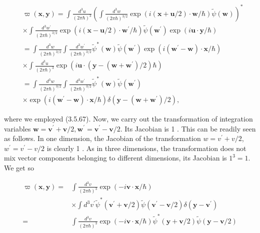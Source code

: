 \documentclass{article}
\begin{document}
\begin{align*}
& \varpi(\boldsymbol{x}, \boldsymbol{y})=\int \frac{d^{3} u}{(2 \pi \hbar)^{3}}\left(\int \frac{d^{3} w}{(2 \pi \hbar)^{3 / 2}} \exp (i(\boldsymbol{x}+\boldsymbol{u} / 2) \cdot \boldsymbol{w} / \hbar) \tilde{\psi}(\boldsymbol{w})\right)^{*}  \tag{3.9.32}\\
& \times \int \frac{d^{3} w^{\prime}}{(2 \pi \hbar)^{3 / 2}} \exp \left(i(\boldsymbol{x}-\boldsymbol{u} / 2) \cdot \boldsymbol{w}^{\prime} / \hbar\right) \tilde{\psi}\left(\boldsymbol{w}^{\prime}\right) \exp (i \boldsymbol{u} \cdot \boldsymbol{y} / \hbar) \\
& =\int \frac{d^{3} w}{(2 \pi \hbar)^{3 / 2}} \int \frac{d^{3} w^{\prime}}{(2 \pi \hbar)^{3 / 2}} \tilde{\psi}^{*}(\boldsymbol{w}) \tilde{\psi}\left(\boldsymbol{w}^{\prime}\right) \exp \left(i\left(\boldsymbol{w}^{\prime}-\boldsymbol{w}\right) \cdot \boldsymbol{x} / \hbar\right) \\
& \times \int \frac{d^{3} u}{(2 \pi \hbar)^{3}} \exp \left(i \boldsymbol{u} \cdot\left(\boldsymbol{y}-\left(\boldsymbol{w}+\boldsymbol{w}^{\prime}\right) / 2\right) \hbar\right) \\
& =\int \frac{d^{3} w}{(2 \pi \hbar)^{3 / 2}} \int \frac{d^{3} w^{\prime}}{(2 \pi \hbar)^{3 / 2}} \tilde{\psi}^{*}(\boldsymbol{w}) \tilde{\psi}\left(\boldsymbol{w}^{\prime}\right) \\
& \times \exp \left(i\left(\boldsymbol{w}^{\prime}-\boldsymbol{w}\right) \cdot \boldsymbol{x} / \hbar\right) \delta\left(\boldsymbol{y}-\left(\boldsymbol{w}+\boldsymbol{w}^{\prime}\right) / 2\right),
\end{align*}
 
where we employed (3.5.67). Now, we carry out the transformation of integration variables $\boldsymbol{w}=\boldsymbol{v}^{\prime}+\boldsymbol{v} / 2, \boldsymbol{w}^{\prime}=\boldsymbol{v}^{\prime}-\boldsymbol{v} / 2$. Its Jacobian is 1 . This can be readily seen as follows. In one dimension, the Jacobian of the transformation $w=v^{\prime}+v / 2$, $w^{\prime}=v^{\prime}-v / 2$ is clearly 1 . As in three dimensions, the transformation does not mix vector components belonging to different dimensions, its Jacobian is $1^{3}=1$. We get so
 
\begin{align*}
\varpi(\boldsymbol{x}, \boldsymbol{y})= & \int \frac{d^{3} v}{(2 \pi \hbar)^{3}} \exp (-i \boldsymbol{v} \cdot \boldsymbol{x} / \hbar)  \tag{3.9.33}\\
& \times \int d^{3} v^{\prime} \tilde{\psi}^{*}\left(\boldsymbol{v}^{\prime}+\boldsymbol{v} / 2\right) \tilde{\psi}\left(\boldsymbol{v}^{\prime}-\boldsymbol{v} / 2\right) \delta\left(\boldsymbol{y}-\boldsymbol{v}^{\prime}\right) \\
= & \int \frac{d^{3} v}{(2 \pi \hbar)^{3}} \exp (-i \boldsymbol{v} \cdot \boldsymbol{x} / \hbar) \tilde{\psi}^{*}(\boldsymbol{y}+\boldsymbol{v} / 2) \tilde{\psi}(\boldsymbol{y}-\boldsymbol{v} / 2)
\end{align*}
 
\end{document}

